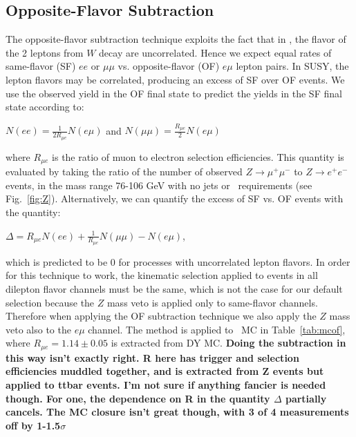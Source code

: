\subsection{Opposite-Flavor Subtraction}
\label{sec:ofsubtraction}

The opposite-flavor subtraction technique exploits the fact that in \ttbar, the flavor
of the 2 leptons from $W$ decay are uncorrelated. Hence we expect equal rates of same-flavor (SF) 
$ee$ or $\mu\mu$ vs. opposite-flavor (OF) $e\mu$ lepton pairs. In SUSY, the lepton flavors may be 
correlated, producing an excess of SF over OF events. We use the observed 
yield in the OF final state to predict the yields in the SF final state according to:

\begin{center}
$N(ee)     = \frac{1}{2R_{\mu e}}N(e\mu)$ and $N(\mu\mu) = \frac{R_{\mu e}}{2}N(e\mu)$
\end{center}

where $R_{\mu e}$ is the ratio of muon to electron selection efficiencies.
This quantity is evaluated by taking the ratio of the number of observed
$Z \to \mu^+\mu^-$ to $Z \to e^+e^-$ events, in the mass range 76-106 GeV
with no jets or \met\ requirements (see Fig.~\ref{fig:Z}). Alternatively, we can quantify
the excess of SF vs. OF events with the quantity:

\begin{center}
$\Delta = R_{\mu e}N(ee) + \frac{1}{R_{\mu e}}N(\mu\mu) - N(e\mu)$,
\end{center}

which is predicted to be 0 for processes with uncorrelated lepton flavors. In order
for this technique to work, the kinematic selection applied to events in all dilepton
flavor channels must be the same, which is not the case for our default selection because the
$Z$ mass veto is applied only to same-flavor channels. Therefore when applying the OF
subtraction technique we also apply the $Z$ mass veto also to the $e\mu$ channel. The
method is applied to \ttbar\ MC in Table~\ref{tab:mcof}, where $R_{\mu e} = 1.14 \pm 0.05$ is extracted
from DY MC.
{\bf Doing the subtraction in this way isn't exactly right. R here has trigger and selection efficiencies
muddled together, and is extracted from Z events but applied to ttbar events. I'm not sure if anything
fancier is needed though. For one, the dependence on R in the quantity $\Delta$ partially cancels.
The MC closure isn't great though, with 3 of 4 measurements off by 1-1.5$\sigma$}




